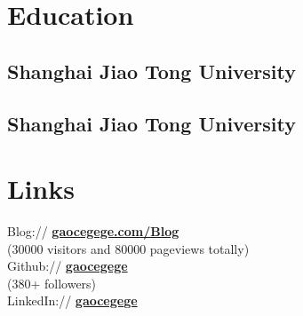 \documentclass[]{deedy-resume-openfont}
\begin{document}
%
%
\lastupdated

%
%

%
%

\begin{minipage}[t]{0.25\textwidth} 


\section{Education} 

\subsection{Shanghai Jiao Tong University}
\sectionsep

\subsection{Shanghai Jiao Tong University}
\sectionsep


\section{Links}
\sectionsep
Blog://  \href{http://gaocegege.com/Blog}{\bf gaocegege.com/Blog} \\
(30000 visitors and 80000 pageviews totally) \\    
Github:// \href{https://github.com/gaocegege}{\bf gaocegege} \\
(380+ followers) \\
LinkedIn://  \href{https://www.linkedin.com/in/gaocegege}{\bf gaocegege} \\



\end{minipage}
\end{document}
